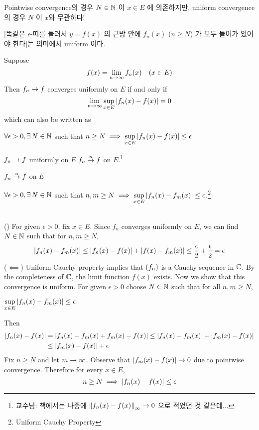 Pointwise convergence의 경우 \(N \in \mathbb{N}\) 이 \(x \in E\) 에 의존하지만, uniform convergence의 경우 \(N\) 이 \(x\)와 무관하다!

[똑같은 \(\epsilon\)-띠를 둘러서 \(y = f(x)\) 의 근방 안에 \(f_n(x)\) (\(n \geq N\)) 가 모두 들어가 있어야 한다]는 의미에서 uniform 이다.

 Suppose
\[
    f(x) = \lim_{n \rightarrow \infty} f_n(x) \quad (x \in E)
\]
Then \(f_n \rightarrow f\) converges uniformly on \(E\) if and only if
\[
    \lim_{n \rightarrow \infty} \sup_{x \in E} \left| f_n(x) - f(x) \right| = 0
\]
which can also be written as
\begin{center}
    \(\forall \epsilon > 0, \exists N\in \N\) such that \(\displaystyle n \geq N \implies \sup_{x \in E} \left| f_n(x) - f(x) \right| \leq \epsilon\)
\end{center}

\notation \(f_n \rightarrow f\) uniformly on \(E\) \miff \(f_n \overset{u}{\rightarrow} f\) on \(E\).\footnote{교수님: 책에서는 나중에 \(\left\lVert f_n(x) - f(x) \right\rVert_\infty \rightarrow 0\) 으로 적었던 것 같은데...}

 
\(f_n \overset{u}{\rightarrow} f\) on \(E\) \miff
\begin{center}
    \(\forall \epsilon > 0, \exists N \in \N\) such that \(n, m \geq N \implies \displaystyle \sup_{x \in E} \left| f_n(x) - f_m(x) \right| \leq \epsilon\).\footnote{Uniform Cauchy Property}
\end{center}

\pf\\
(\mimp) For given \(\epsilon > 0\), fix \(x \in E\). Since \(f_n\) converges uniformly on \(E\), we can find \(N \in \mathbb{N}\) such that for \(n, m \geq N\),
\[
    \left| f_n(x) - f_m(x) \right| \leq \left| f_n(x) - f(x) \right| + \left| f(x) - f_m(x) \right| \leq \frac{\epsilon}{2} + \frac{\epsilon}{2} = \epsilon
\]
(\(\impliedby\)) Uniform Cauchy property implies that \(\left( f_n \right)\) is a Cauchy sequence in \(\mathbb{C}\). By the completeness of \(\mathbb{C}\), the limit function \(f(x)\) exists. Now we show that this convergence is uniform.
For given \(\epsilon > 0\) choose \(N \in \mathbb{N}\) such that for all \(n, m \geq N\),
\begin{center}
    \(\displaystyle \sup_{x \in E} \left| f_n(x) - f_m(x) \right| \leq \epsilon\)
\end{center}
Then
\[
    \begin{aligned}
        \left| f_n(x) - f(x) \right| &= \left| f_n(x) - f_m(x) + f_m(x) - f(x) \right| \leq \left| f_n(x) - f_m(x) \right| + \left| f_m(x) - f(x) \right|\\
        &\leq \left| f_m(x) - f(x) \right| + \epsilon
    \end{aligned}
\]
Fix \(n \geq N\) and let \(m \rightarrow \infty\). Observe that \(\left| f_m(x) - f(x) \right| \rightarrow 0\) due to pointwise convergence. Therefore for every \(x \in E\),
\[
    n \geq N \implies \left| f_n(x) - f(x) \right| \leq \epsilon
\]

\pagebreak
